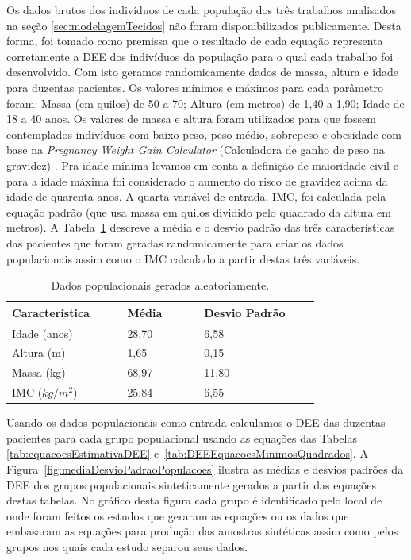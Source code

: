 Os dados brutos dos indivíduos de cada população dos três trabalhos analisados na seção \ref{sec:modelagemTecidos} não foram disponibilizados publicamente. Desta forma, foi tomado como premissa que o resultado de cada equação representa corretamente a \acrshort{DEE} dos indivíduos da população para o qual cada trabalho foi desenvolvido. Com isto geramos randomicamente dados de massa, altura e idade para duzentas pacientes. Os valores mínimos e máximos para cada parâmetro foram: Massa (em quilos) de 50 a 70; Altura (em metros) de 1,40 a 1,90; Idade de 18 a 40 anos. Os valores de massa e altura foram utilizados para que fossem contemplados indivíduos com baixo peso, peso médio, sobrepeso e obesidade com base na \textit{Pregnancy Weight Gain Calculator} (Calculadora de ganho de peso na gravidez) \cite{MTILLC2019}. Pra idade mínima levamos em conta a definição de maioridade civil e para a idade máxima foi considerado o aumento do risco de gravidez acima da idade de quarenta anos. A quarta variável de entrada, \acrshort{IMC}, foi calculada pela equação padrão (que usa massa em quilos dividido pelo quadrado da altura em metros).  A Tabela~\ref{tab:DadosPopulacaoGerada} descreve a média e o desvio padrão das três características das pacientes que foram geradas randomicamente para criar os dados populacionais assim como o \acrshort{IMC} calculado a partir destas três variáveis. 

\begin{table}[!ht]
\begin{center}
\caption{Dados populacionais gerados aleatoriamente.}
\label{tab:DadosPopulacaoGerada}
\begin{tabular}{|p{0.3\linewidth}|p{0.2\linewidth}|p{0.3\linewidth}|}
\hline
\textbf{Característica} & \textbf{Média} & \textbf{Desvio Padrão}\\
\hline\hline
Idade (anos) & 28,70 & 6,58\\
Altura (m) & 1,65 & 0,15\\
Massa (kg) & 68,97 & 11,80\\
IMC ($kg/m^2$) & 25.84 & 6,55\\
\hline
\end{tabular}
\end{center}
\end{table}

Usando os dados populacionais como entrada calculamos o \acrshort{DEE} das duzentas pacientes para cada grupo populacional usando as equações das Tabelas \ref{tab:equacoesEstimativaDEE} e~\ref{tab:DEEEquacoesMinimosQuadrados}. A Figura~\ref{fig:mediaDesvioPadraoPopulacoes} ilustra as médias e desvios padrões da \acrshort{DEE} dos grupos populacionais sinteticamente gerados a partir das equações destas tabelas. No gráfico desta figura cada grupo é identificado pelo local de onde  foram feitos os estudos que geraram as equações ou os dados que embasaram as equações para produção das amostras sintéticas assim como pelos grupos nos quais cada estudo separou seus dados.

